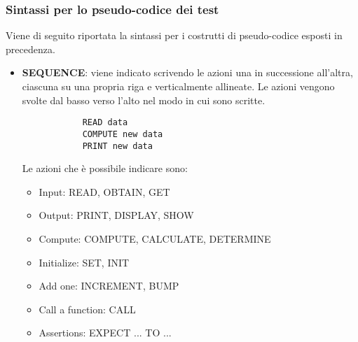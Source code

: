 	
	\subsubsection{Sintassi per lo pseudo-codice dei test}
	Viene di seguito riportata la sintassi per i costrutti di pseudo-codice esposti in precedenza.
	
	\begin{itemize}
	\item \textbf{SEQUENCE}: viene indicato scrivendo le azioni una in successione all'altra, ciascuna su una propria riga e verticalmente allineate. Le azioni vengono svolte dal basso verso l'alto nel modo in cui sono scritte. 
		\begin{Verbatim}
			READ data
			COMPUTE new data
			PRINT new data
		\end{Verbatim}	 
		Le azioni che è possibile indicare sono:
		\begin{itemize}
			\item Input: READ, OBTAIN, GET
			\item Output: PRINT, DISPLAY, SHOW
			\item Compute: COMPUTE, CALCULATE, DETERMINE
			\item Initialize: SET, INIT
			\item Add one: INCREMENT, BUMP
			\item Call a function: CALL
			\item Assertions: EXPECT ... TO ...
		\end{itemize}
		

\end{itemize}
